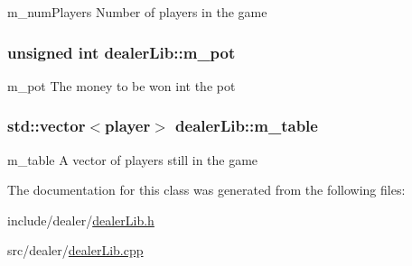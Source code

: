 m\-\_\-num\-Players Number of players in the game 

\hypertarget{classdealerLib_a44da7b0e66a001b5ee6d79892bf1760d}{
\subsubsection[{m\-\_\-pot}]{\setlength{\rightskip}{0pt plus 5cm}unsigned int dealer\-Lib\-::m\-\_\-pot\hspace{0.3cm}{\ttfamily [private]}}}\label{classdealerLib_a44da7b0e66a001b5ee6d79892bf1760d}


m\-\_\-pot The money to be won int the pot 

\hypertarget{classdealerLib_a7d30ff8c4afd94b5db2b12759bbf60cc}{
\subsubsection[{m\-\_\-table}]{\setlength{\rightskip}{0pt plus 5cm}std\-::vector$<${\bf player}$>$ dealer\-Lib\-::m\-\_\-table\hspace{0.3cm}{\ttfamily [private]}}}\label{classdealerLib_a7d30ff8c4afd94b5db2b12759bbf60cc}


m\-\_\-table A vector of players still in the game 



The documentation for this class was generated from the following files\-:\begin{DoxyCompactItemize}
\item 
include/dealer/\hyperlink{dealerLib_8h}{dealer\-Lib.\-h}\item 
src/dealer/\hyperlink{dealerLib_8cpp}{dealer\-Lib.\-cpp}\end{DoxyCompactItemize}
